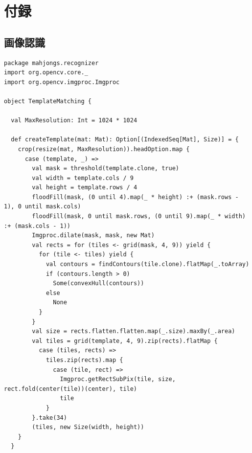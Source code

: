 \documentclass{jsarticle}
\begin{document}
\newpage

\section{付録}

\subsection{画像認識}
\begin{lstlisting}[caption=TemplateMatching.scala,label=TemplateMatching]
package mahjongs.recognizer
import org.opencv.core._
import org.opencv.imgproc.Imgproc

object TemplateMatching {

  val MaxResolution: Int = 1024 * 1024

  def createTemplate(mat: Mat): Option[(IndexedSeq[Mat], Size)] = {
    crop(resize(mat, MaxResolution)).headOption.map {
      case (template, _) =>
        val mask = threshold(template.clone, true)
        val width = template.cols / 9
        val height = template.rows / 4
        floodFill(mask, (0 until 4).map(_ * height) :+ (mask.rows - 1), 0 until mask.cols)
        floodFill(mask, 0 until mask.rows, (0 until 9).map(_ * width) :+ (mask.cols - 1))
        Imgproc.dilate(mask, mask, new Mat)
        val rects = for (tiles <- grid(mask, 4, 9)) yield {
          for (tile <- tiles) yield {
            val contours = findContours(tile.clone).flatMap(_.toArray)
            if (contours.length > 0)
              Some(convexHull(contours))
            else
              None
          }
        }
        val size = rects.flatten.flatten.map(_.size).maxBy(_.area)
        val tiles = grid(template, 4, 9).zip(rects).flatMap {
          case (tiles, rects) =>
            tiles.zip(rects).map {
              case (tile, rect) =>
                Imgproc.getRectSubPix(tile, size, rect.fold(center(tile))(center), tile)
                tile
            }
        }.take(34)
        (tiles, new Size(width, height))
    }
  }


\end{lstlisting}
\end{document}
